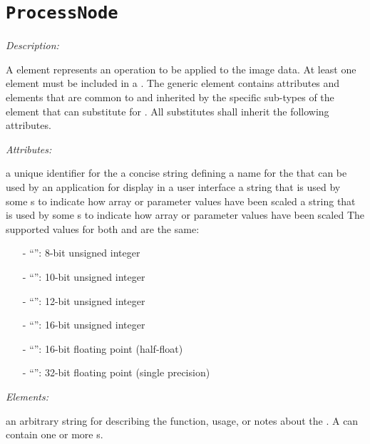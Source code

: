 \section{\texttt{ProcessNode}}
\label{sec:ProcessNode}

\emph{Description:} \par
A  element represents an operation to be applied to the image data. At least one  element must be included in a . The generic  element contains attributes and elements that are common to and inherited by the specific sub-types of the  element that can substitute for . All  substitutes shall inherit the following attributes.

\emph{Attributes:}
\label{sec:process-node-attr}
\begin{xmlfields}
	\xmlitem[id][optional]  a unique identifier for the 
	\xmlitem[name][optional] a concise string defining a name for the  that can be used by an application for display in a user interface
	\xmlitem[inBitDepth][required] a string that is used by some s to indicate how array or parameter values have been scaled
	\xmlitem[outBitDepth][required] a string that is used by some s to indicate how array or parameter values have been scaled
	The supported values for both  and  are the same:
	    \begin{itemize}
            \item[-] ``'': 8-bit unsigned integer
            \item[-] ``'': 10-bit unsigned integer
            \item[-] ``'': 12-bit unsigned integer
            \item[-] ``'': 16-bit unsigned integer
            \item[-] ``'': 16-bit floating point (half-float)
            \item[-] ``'': 32-bit floating point (single precision)
        \end{itemize}
\end{xmlfields}

\emph{Elements:}
\label{sec:process-node-elements}
\begin{xmlfields}
	\xmlitem[Description][optional] an arbitrary string for describing the function, usage, or notes about the . A  can contain one or more s.
\end{xmlfields}
